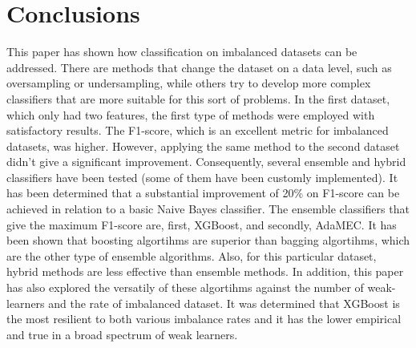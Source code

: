 \documentclass[conference]{IEEEtran}
\begin{document}


\section{Conclusions}
This paper has shown how classification on imbalanced datasets can be addressed. There are methods that change the dataset on a data level, such as oversampling or undersampling, while others try to develop more complex classifiers that are more suitable for this sort of problems. In the first dataset, which only had two features, the first type of methods were employed with satisfactory results. The F1-score, which is an excellent metric for imbalanced datasets, was higher. However, applying the same method to the second dataset didn't give a significant improvement. Consequently, several ensemble and hybrid classifiers have been tested (some of them have been customly implemented). It has been determined that a substantial improvement of 20\% on F1-score can be achieved in relation to a basic Naive Bayes classifier. The ensemble classifiers that give the maximum F1-score are, first, XGBoost, and secondly, AdaMEC. It has been shown that boosting algortihms are superior than bagging algortihms, which are the other type of ensemble algorithms. Also, for this particular dataset, hybrid methods are less effective than ensemble methods. In addition, this paper has also explored the versatily of these algortihms against the number of weak-learners and the rate of imbalanced dataset. It was determined that XGBoost is the most resilient to both various imbalance rates and it has the lower empirical and true in a broad spectrum of weak learners. 

\vspace{12pt}

 
\end{document}
